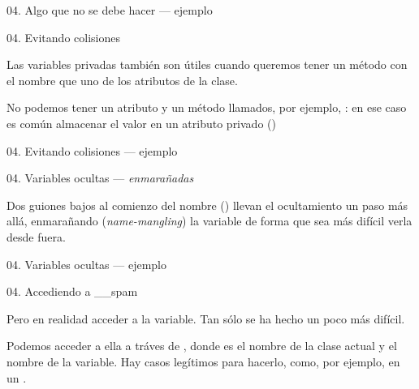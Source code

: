 \begin{frame}{04. Algo que no se debe hacer — ejemplo}
  \footnotesize
\end{frame}

\begin{frame}{04. Evitando colisiones}
  \begin{block}{}
    \centering
    Las variables privadas también son útiles cuando queremos tener un
    método con el  nombre que uno de los atributos de
    la clase.
  \end{block}

  \begin{center}
    \small
    No podemos tener un atributo y un método llamados, por ejemplo,
    : en ese caso es común almacenar el valor en un
    atributo privado ()
  \end{center}
\end{frame}

\begin{frame}{04. Evitando colisiones — ejemplo}
  \scriptsize
\end{frame}

\begin{frame}{04. Variables ocultas — \textit{enmarañadas}}
  \begin{block}{}
    \centering
     Dos guiones bajos al comienzo del nombre ()
     llevan el ocultamiento un paso más allá, enmarañando
     (\textit{name-mangling}) la variable de forma que sea más difícil
     verla desde fuera.
  \end{block}
\end{frame}

\begin{frame}{04. Variables ocultas — ejemplo}
  \footnotesize
\end{frame}

\begin{frame}{04. Accediendo a \_\_spam}
  \begin{block}{}
    \centering
     Pero en realidad  acceder a la
     variable. Tan sólo se ha hecho un poco más difícil.
  \end{block}

  \begin{center}
    \small
    Podemos acceder a ella a tráves de ,
    donde  es el nombre de la clase actual y
     el nombre de la variable.  Hay casos legítimos
    para hacerlo, como, por ejemplo, en un .
  \end{center}
\end{frame}


